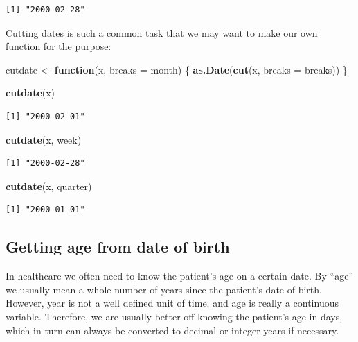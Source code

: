\documentclass[
]{book}
\newenvironment{Shaded}{\begin{snugshade}}{\end{snugshade}}
\newcommand{\AttributeTok}[1]{\textcolor[rgb]{0.13,0.29,0.53}{#1}}
\newcommand{\ControlFlowTok}[1]{\textcolor[rgb]{0.13,0.29,0.53}{\textbf{#1}}}
\newcommand{\FunctionTok}[1]{\textcolor[rgb]{0.13,0.29,0.53}{\textbf{#1}}}
\newcommand{\NormalTok}[1]{#1}
\newcommand{\OtherTok}[1]{\textcolor[rgb]{0.56,0.35,0.01}{#1}}
\newcommand{\StringTok}[1]{\textcolor[rgb]{0.31,0.60,0.02}{#1}}
\begin{document}
\begin{verbatim}
[1] "2000-02-28"
\end{verbatim}

Cutting dates is such a common task that we may want to make our own
function for the purpose:

\begin{Shaded}
\begin{Highlighting}[]
\NormalTok{cutdate }\OtherTok{\textless{}{-}} \ControlFlowTok{function}\NormalTok{(x, }\AttributeTok{breaks =} \StringTok{\textquotesingle{}month\textquotesingle{}}\NormalTok{) \{}
  \FunctionTok{as.Date}\NormalTok{(}\FunctionTok{cut}\NormalTok{(x, }\AttributeTok{breaks =}\NormalTok{ breaks))}
\NormalTok{\}}

\FunctionTok{cutdate}\NormalTok{(x)}
\end{Highlighting}
\end{Shaded}

\begin{verbatim}
[1] "2000-02-01"
\end{verbatim}

\begin{Shaded}
\begin{Highlighting}[]
\FunctionTok{cutdate}\NormalTok{(x, }\StringTok{\textquotesingle{}week\textquotesingle{}}\NormalTok{)}
\end{Highlighting}
\end{Shaded}

\begin{verbatim}
[1] "2000-02-28"
\end{verbatim}

\begin{Shaded}
\begin{Highlighting}[]
\FunctionTok{cutdate}\NormalTok{(x, }\StringTok{\textquotesingle{}quarter\textquotesingle{}}\NormalTok{)}
\end{Highlighting}
\end{Shaded}

\begin{verbatim}
[1] "2000-01-01"
\end{verbatim}

\subsection{Getting age from date of
birth}\label{getting-age-from-date-of-birth}

In healthcare we often need to know the patient's age on a certain date.
By ``age'' we usually mean a whole number of years since the patient's
date of birth. However, year is not a well defined unit of time, and age
is really a continuous variable. Therefore, we are usually better off
knowing the patient's age in days, which in turn can always be converted
to decimal or integer years if necessary.
\end{document}
